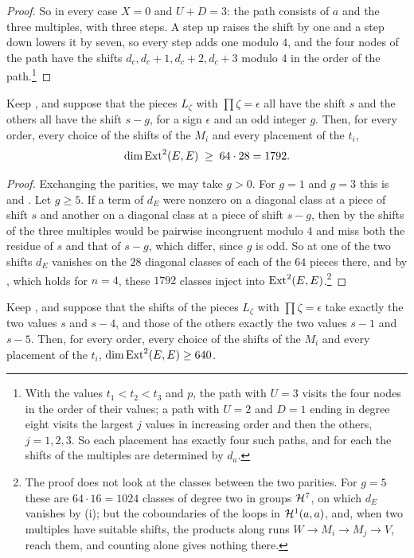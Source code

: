 \begin{proof}
So in every case $X=0$ and $U+D=3$: the path consists of $a$ and the three
multiples, with three steps. A step up raises the shift by one and a step
down lowers it by seven, so every step adds one modulo $4$, and the four
nodes of the path have the shifts $d_{c},d_{c}+1,d_{c}+2,d_{c}+3$ modulo $4$
in the order of the path.\footnote{With the values $t_{1}<t_{2}<t_{3}$ and
$p$, the path with $U=3$ visits the four nodes in the order of their values;
a path with $U=2$ and $D=1$ ending in degree eight visits the largest $j$
values in increasing order and then the others, $j=1,2,3$. So each placement
has exactly four such paths, and for each the shifts of the multiples are
determined by $d_{a}$.}
\end{proof}

\begin{proposition}\label{prop:efoursingle}
Keep , and suppose that the pieces $L_{\zeta}$ with
$\prod\zeta=\epsilon$ all have the shift $s$ and the others all have the
shift $s-g$, for a sign $\epsilon$ and an odd integer $g$. Then, for every
order, every choice of the shifts of the $M_{i}$ and every placement of the
$t_{i}$,
\[
  \dim\operatorname{Ext}^{2}(E,E)\;\ge\;64\cdot28=1792 .
\]
\end{proposition}

\begin{proof}
Exchanging the parities, we may take $g>0$. For $g=1$ and $g=3$ this is
 and . Let $g\ge5$. If a
term of $d_{E}$ were nonzero on a diagonal class at a piece of shift $s$ and
another on a diagonal class at a piece of shift $s-g$, then by
 the shifts of the three multiples would be pairwise
incongruent modulo $4$ and miss both the residue of $s$ and that of $s-g$,
which differ, since $g$ is odd. So at one of the two shifts $d_{E}$ vanishes
on the $28$ diagonal classes of each of the $64$ pieces there, and by
, which holds for $n=4$, these $1792$ classes
inject into $\operatorname{Ext}^{2}(E,E)$.\footnote{The proof does not look at the classes
between the two parities. For $g=5$ these are $64\cdot16=1024$ classes of
degree two in groups $\mathcal{H}^{7}$, on which $d_{E}$ vanishes by
(i); but the coboundaries of the loops in
$\mathcal{H}^{1}(a,a)$, and, when two multiples have suitable shifts, the products
along runs $W\to M_{i}\to M_{j}\to V$, reach them, and counting alone gives
nothing there.}
\end{proof}

\begin{proposition}\label{prop:efourpairs}
Keep , and suppose that the shifts of the pieces
$L_{\zeta}$ with $\prod\zeta=\epsilon$ take exactly the two values $s$ and
$s-4$, and those of the others exactly the two values $s-1$ and $s-5$. Then,
for every order, every choice of the shifts of the $M_{i}$ and every
placement of the $t_{i}$, $\dim\operatorname{Ext}^{2}(E,E)\ge640$.
\end{proposition}

